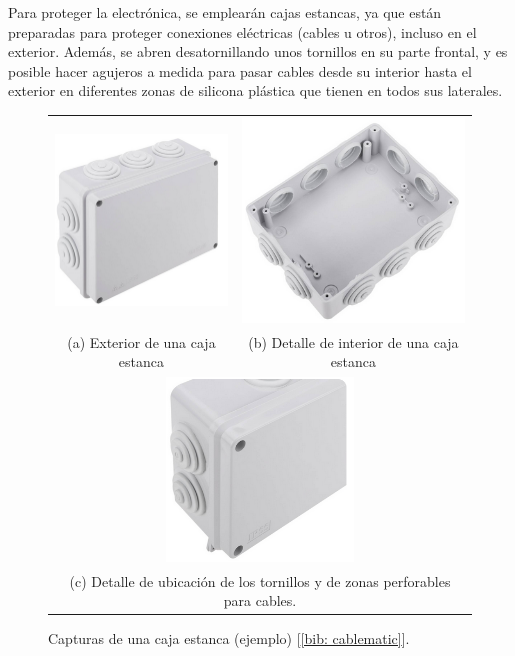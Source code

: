 \documentclass[12pt]{article}
\begin{document}
	\noindent Para proteger la electrónica, se emplearán cajas estancas, ya que están preparadas para proteger conexiones eléctricas (cables u otros), incluso en el exterior. Además, se abren desatornillando unos tornillos en su parte frontal, y es posible hacer agujeros a medida  para pasar cables desde su interior hasta el exterior en diferentes zonas de silicona plástica que tienen en todos sus laterales. \\
	
	\pagebreak
	
	\begin{figure}[h]
		\begin{center}
			\begin{tabular}{cc}
				\includegraphics[width=50mm]{img/caja_estanca_1.png} &   \includegraphics[width=60mm]{img/caja_estanca_2.png} \\
				(a) Exterior de una caja estanca & (b) Detalle de interior de una caja estanca  \\[6pt]
				\multicolumn{2}{c}{\includegraphics[width=50mm]{img/caja_estanca_3.png} }\\
				\multicolumn{2}{c}{(c) Detalle de ubicación de los tornillos y de zonas perforables para cables. }
			\end{tabular}
			\caption{Capturas de una caja estanca (ejemplo) [\ref{bib: cablematic}]. }
			\label{fig: capturas caja estanca.}
		\end{center}
	\end{figure}
	
\end{document}
